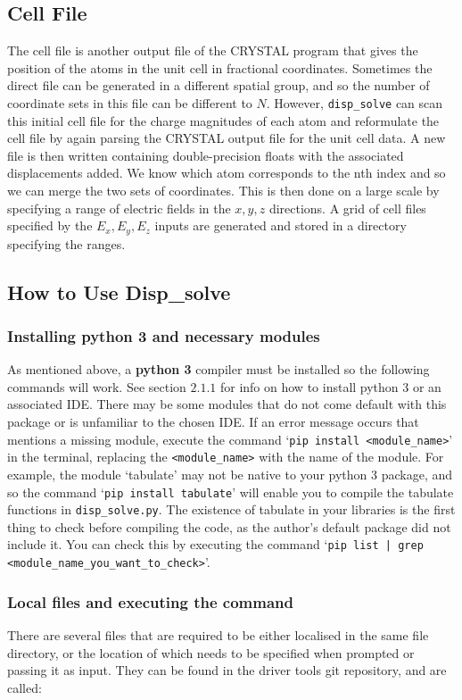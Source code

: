 \documentclass[10pt]{article}
\begin{document}
\subsection{Cell File}
The cell file is another output file of the CRYSTAL program that gives the position of the atoms in the unit cell in fractional coordinates. Sometimes the direct file can be generated in a different spatial group, and so the number of coordinate sets in this file can be different to $N$. However, \texttt{disp\_solve} can scan this initial cell file for the charge magnitudes of each atom and reformulate the cell file by again parsing the CRYSTAL output file for the unit cell data. A new file is then written containing double-precision floats with the associated displacements added. We know which atom corresponds to the nth index and so we can merge the two sets of coordinates. This is then done on a large scale by specifying a range of electric fields in the $x,y,z$ directions. A grid of cell files specified by the $E_x,E_y,E_z$ inputs are generated and stored in a directory specifying the ranges. 

\subsection{How to Use Disp\_solve}
\subsubsection{Installing python 3 and necessary modules}
As mentioned above, a \textbf{python 3} compiler must be installed so the following commands will work. See section $2.1.1$ for info on how to install python 3 or an associated IDE. There may be some modules that do not come default with this package or is unfamiliar to the chosen IDE. If an error message occurs that mentions a missing module, execute the command `\texttt{pip install <module\_name>}' in the terminal, replacing the \texttt{<module\_name>} with the name of the module. For example, the module `tabulate' may not be native to your python 3 package, and so the command `\texttt{pip install tabulate}' will enable you to compile the tabulate functions in \texttt{disp\_solve.py}. The existence of tabulate in your libraries is the first thing to check before compiling the code, as the author's default package did not include it. You can check this by executing the command `\texttt{pip list | grep <module\_name\_you\_want\_to\_check>}'.

\subsubsection{Local files and executing the command}
There are several files that are required to be either localised in the same file directory, or the location of which needs to be specified when prompted or passing it as input. They can be found in the driver tools git repository, and are called:
\end{document}
